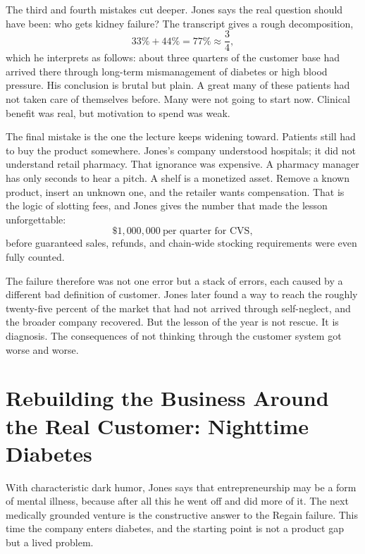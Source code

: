 The third and fourth mistakes cut deeper. Jones says the real question should have been: who gets kidney failure? The transcript gives a rough decomposition,
\begin{equation}
33\%+44\%=77\%\approx \frac{3}{4},
\end{equation}
which he interprets as follows: about three quarters of the customer base had arrived there through long-term mismanagement of diabetes or high blood pressure. His conclusion is brutal but plain. A great many of these patients had not taken care of themselves before. Many were not going to start now. Clinical benefit was real, but motivation to spend was weak.

The final mistake is the one the lecture keeps widening toward. Patients still had to buy the product somewhere. Jones's company understood hospitals; it did not understand retail pharmacy. That ignorance was expensive. A pharmacy manager has only seconds to hear a pitch. A shelf is a monetized asset. Remove a known product, insert an unknown one, and the retailer wants compensation. That is the logic of slotting fees, and Jones gives the number that made the lesson unforgettable:
\begin{equation}
\$1{,}000{,}000\ \text{per quarter for CVS},
\end{equation}
before guaranteed sales, refunds, and chain-wide stocking requirements were even fully counted.

The failure therefore was not one error but a stack of errors, each caused by a different bad definition of customer. Jones later found a way to reach the roughly twenty-five percent of the market that had not arrived through self-neglect, and the broader company recovered. But the lesson of the year is not rescue. It is diagnosis. The consequences of not thinking through the customer system got worse and worse.

\section{Rebuilding the Business Around the Real Customer: Nighttime Diabetes}

With characteristic dark humor, Jones says that entrepreneurship may be a form of mental illness, because after all this he went off and did more of it. The next medically grounded venture is the constructive answer to the Regain failure. This time the company enters diabetes, and the starting point is not a product gap but a lived problem.

